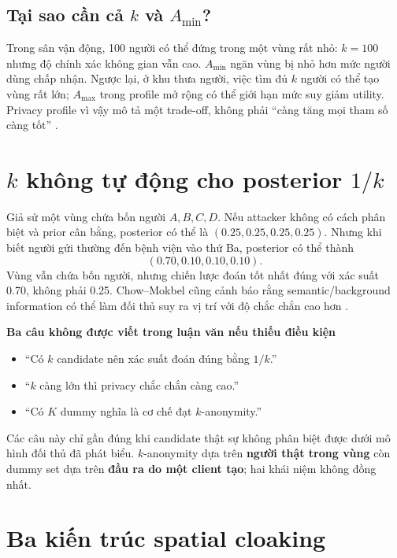 \documentclass[11pt,a4paper,oneside]{report}
\newenvironment{warningbox}[1][Cẩn thận]{%
  \par\medskip\noindent\begin{lrbox}{\warningstore}\begin{minipage}{.89\textwidth}
  {\sffamily\bfseries\color{red}#1}\par\smallskip}{%
  \end{minipage}\end{lrbox}\begin{center}\setlength{\fboxsep}{7pt}%
  \fcolorbox{red}{lightred}{\usebox{\warningstore}}\end{center}\medskip}
\begin{document}
\subsection{Tại sao cần cả \texorpdfstring{$k$}{k} và \texorpdfstring{$A_{\min}$}{A-min}?}

Trong sân vận động, 100 người có thể đứng trong một vùng rất nhỏ: $k=100$ nhưng
độ chính xác không gian vẫn cao. $A_{\min}$ ngăn vùng bị nhỏ hơn mức người dùng
chấp nhận. Ngược lại, ở khu thưa người, việc tìm đủ $k$ người có thể tạo vùng rất
lớn; $A_{\max}$ trong profile mở rộng có thể giới hạn mức suy giảm utility. Privacy
profile vì vậy mô tả một trade-off, không phải ``càng tăng mọi tham số càng tốt''
\cite{chow2009casper}.

\section{\texorpdfstring{$k$}{k} không tự động cho posterior \texorpdfstring{$1/k$}{1/k}}

Giả sử một vùng chứa bốn người $A,B,C,D$. Nếu attacker không có cách phân biệt
và prior cân bằng, posterior có thể là $(0.25,0.25,0.25,0.25)$. Nhưng khi biết người
gửi thường đến bệnh viện vào thứ Ba, posterior có thể thành
\[
(0.70,0.10,0.10,0.10).
\]
Vùng vẫn chứa bốn người, nhưng chiến lược đoán tốt nhất đúng với xác suất 0.70,
không phải 0.25. Chow--Mokbel cũng cảnh báo rằng semantic/background information
có thể làm đối thủ suy ra vị trí với độ chắc chắn cao hơn
\cite{chow2011trajectory}.

\begin{warningbox}[Ba câu không được viết trong luận văn nếu thiếu điều kiện]
\begin{itemize}
  \item ``Có $k$ candidate nên xác suất đoán đúng bằng $1/k$.''
  \item ``$k$ càng lớn thì privacy chắc chắn càng cao.''
  \item ``Có $K$ dummy nghĩa là cơ chế đạt $k$-anonymity.''
\end{itemize}
Các câu này chỉ gần đúng khi candidate thật sự không phân biệt được dưới mô hình
đối thủ đã phát biểu. $k$-anonymity dựa trên \textbf{người thật trong vùng} còn
dummy set dựa trên \textbf{đầu ra do một client tạo}; hai khái niệm không đồng nhất.
\end{warningbox}

\section{Ba kiến trúc spatial cloaking}
\end{document}
